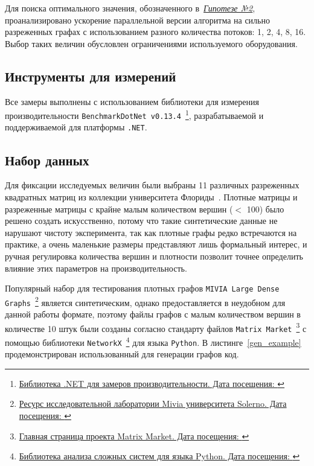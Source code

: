 Для поиска оптимального значения, обозначенного в~\hyperref[t2]{\textit{Гипотезе №2}}, проанализировано ускорение параллельной версии алгоритма на сильно разреженных графах с использованием разного количества потоков: 1, 2, 4, 8, 16. Выбор таких величин обусловлен ограничениями используемого оборудования.



\subsection{Инструменты для измерений}
Все замеры выполнены с использованием библиотеки для измерения производительности \texttt{BenchmarkDotNet v0.13.4}~\footnote{\href{https://benchmarkdotnet.org/}{Библиотека .NET для замеров производительности. Дата посещения: }}, разрабатываемой и поддерживаемой для платформы \texttt{.NET}.




\subsection{Набор данных}
Для фиксации исследуемых величин были выбраны 11 различных разреженных квадратных матриц из коллекции университета Флориды~\cite{matrixData}. Плотные матрицы и разреженные матрицы с крайне малым количеством вершин ($<$ 100) было решено создать искусственно, потому что такие синтетические данные не нарушают чистоту эксперимента, так как плотные графы редко встречаются на практике, а очень маленькие размеры представляют лишь формальный интерес, и ручная регулировка количества вершин и плотности позволит точнее определить влияние этих параметров на производительность.

Популярный набор для тестирования плотных графов \texttt{MIVIA Large Dense Graphs}~\footnote{\href{https://mivia.unisa.it/datasets/graph-database/mivia2-graph-database/}{Ресурс исследовательной лаборатории Mivia университета Solerno. Дата посещения: }} является синтетическим, однако предоставляется в неудобном для данной работы формате, поэтому файлы графов с малым количеством вершин в количестве 10 штук были созданы согласно стандарту файлов \texttt{Matrix Market}~\footnote{\href{https://math.nist.gov/MatrixMarket/}{Главная страница проекта Matrix Market. Дата посещения: }} с помощью библиотеки \texttt{NetworkX}~\footnote{\href{https://networkx.org/}{Библиотека анализа сложных систем для языка Python. Дата посещения: }} для языка \texttt{Python}. В листинге~\ref{gen_example} продемонстрирован использованный для генерации графов код.

